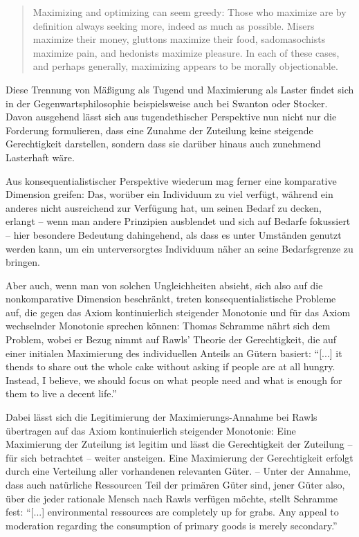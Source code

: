 \documentclass[a4paper]{thesis}
\begin{document}
\begin{quote}
Maximizing and optimizing can seem greedy: Those who maximize are by definition always seeking more, indeed as much as possible. Misers maximize their money, gluttons maximize their food, sadomasochists maximize pain, and hedonists maximize pleasure. In each of these cases, and perhaps generally, maximizing appears to be morally objectionable.
\end{quote}

Diese Trennung von Mäßigung als Tugend und Maximierung als Laster findet sich in der Gegenwartsphilosophie beispielsweise auch bei Swanton oder Stocker. Davon ausgehend lässt sich aus tugendethischer Perspektive nun nicht nur die Forderung formulieren, dass eine Zunahme der Zuteilung keine steigende Gerechtigkeit darstellen, sondern dass sie darüber hinaus auch zunehmend Lasterhaft wäre.

Aus konsequentialistischer Perspektive wiederum mag ferner eine komparative Dimension greifen: Das, worüber ein Individuum zu viel verfügt, während ein anderes nicht ausreichend zur Verfügung hat, um seinen Bedarf zu decken, erlangt – wenn man andere Prinzipien ausblendet und sich auf Bedarfe fokussiert – hier besondere Bedeutung dahingehend, als dass es unter Umständen genutzt werden kann, um ein unterversorgtes Individuum näher an seine Bedarfsgrenze zu bringen.

Aber auch, wenn man von solchen Ungleichheiten absieht, sich also auf die nonkomparative Dimension beschränkt, treten konsequentialistische Probleme auf, die gegen das Axiom kontinuierlich steigender Monotonie und für das Axiom wechselnder Monotonie sprechen können: Thomas Schramme nährt sich dem Problem, wobei er Bezug nimmt auf Rawls' Theorie der Gerechtigkeit, die auf einer initialen Maximierung des individuellen Anteils an Gütern basiert: \enquote{[...] it thends to share out the whole cake without asking if people are at all hungry. Instead, I believe, we should focus on what people need and what is enough for them to live a decent life.}

Dabei lässt sich die Legitimierung der Maximierungs-Annahme bei Rawls übertragen auf das Axiom kontinuierlich steigender Monotonie: Eine Maximierung der Zuteilung ist legitim und lässt die Gerechtigkeit der Zuteilung -- für sich betrachtet -- weiter ansteigen. Eine Maximierung der Gerechtigkeit erfolgt durch eine Verteilung aller vorhandenen relevanten Güter. -- Unter der Annahme, dass auch natürliche Ressourcen Teil der primären Güter sind, jener Güter also, über die jeder rationale Mensch nach Rawls verfügen möchte, stellt Schramme fest: \enquote{[...] environmental ressources are completely up for grabs. Any appeal to moderation regarding the consumption of primary goods is merely secondary.}
\end{document}
